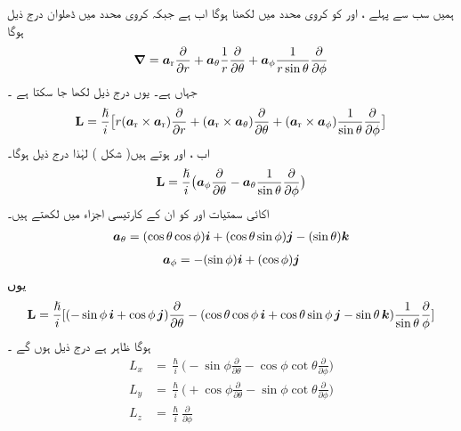ہمیں سب سے پہلے ،   اور  کو کروی محدد میں لکھنا ہوگا اب   ہے جبکہ کروی محدد میں ڈھلوان درج ذیل ہوگا 
\begin{align}
{\ensuremath{{\boldsymbol{\nabla}}}} = {\boldsymbol{a}}_{\textup{r}} \frac{\partial}{\partial r} + {\boldsymbol{a}}_{\theta} \frac{1}{r} \frac{\partial}{\partial \theta} + {\boldsymbol{a}}_{\phi} \frac{1}{r \sin {\theta}} \frac{\partial}{\partial \phi}
\end{align}
جہاں  ہے۔ یوں درج ذیل لکھا جا سکتا ہے ۔
\begin{align*}
\operatorname{\mathbf{L}} = \frac{\hslash}{i} \big [ r ({\boldsymbol{a}}_{\textup{r}} \times {\boldsymbol{a}}_{\textup{r}}) \frac{\partial}{\partial r} + ({\boldsymbol{a}}_{\textup{r}} \times {\boldsymbol{a}}_{\theta}) \frac{\partial}{\partial \theta} + ({\boldsymbol{a}}_{\textup{r}} \times {\boldsymbol{a}}_{\phi}) \frac{1}{\sin \theta} \frac{\partial}{\partial \phi} \big ]
\end{align*}
اب ،   اور  ہوتے
 ہیں( شکل )   لہٰذا درج ذیل ہوگا۔ 
\begin{align}
\operatorname{\mathbf{L}} = \frac{\hslash}{i} \big ( {\boldsymbol{a}}_{\phi} \frac{\partial}{\partial \theta} - {\boldsymbol{a}}_{\theta} \frac{1}{\sin \theta} \frac{\partial}{\partial \phi} \big )
\end{align}
اکائی  سمتیات  اور  کو ان کے کارتیسی اجزاء میں لکھتے ہیں۔ 
\begin{align}
{\boldsymbol{a}}_{\theta} = (\cos \theta \cos \phi) {\boldsymbol{i}} + (\cos \theta \sin \phi) {\boldsymbol{j}} - (\sin \theta) {\boldsymbol{k}}
\end{align}
\begin{align}
{\boldsymbol{a}}_{\phi} = - (\sin \phi) {\boldsymbol{i}} + (\cos \phi) {\boldsymbol{j}}
\end{align}
یوں 
\begin{align*}
\operatorname{\mathbf{L}} = \frac{\hslash}{i} [(- \sin \phi \,{\boldsymbol{i}} + \cos \phi\, {\boldsymbol{j}}) \frac{\partial}{\partial \theta} - (\cos \theta \cos \phi \,{\boldsymbol{i}} + \cos \theta \sin \phi \,{\boldsymbol{j}} - \sin \theta \,{\boldsymbol{k}}) \frac{1}{\sin \theta} \frac{\partial}{\phi}]
\end{align*}
ہوگا ظاہر ہے درج ذیل ہوں گے ۔
\begin{align}
L_x &= \frac{\hslash}{i} \big ( - \sin \phi \frac{\partial}{\partial \theta} - \cos \phi \cot \theta \frac{\partial}{\partial \phi} \big )\\
L_y &= \frac{\hslash}{i} \big ( + \cos \phi \frac{\partial}{\partial \theta} - \sin \phi \cot \theta \frac{\partial}{\partial \phi} \big )\\
L_z &= \frac{\hslash}{i} \frac{\partial}{\partial \phi}\label{مساوات_تین_ابعادی_زیڈ_عامل}
\end{align} 

